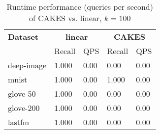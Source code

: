 \begin{table*}[!t]
    \caption{Runtime performance (queries per second) of CAKES vs. linear, $k=100$}
    \label{table:results:ann-alt-100}
    \vskip 0.15in
    \begin{center}
    \begin{small}
    \begin{sc}
    \begin{tabular}{|l|l|l|l|l|}
    \textbf{Dataset}  & \multicolumn{2}{|c|}{\textbf{linear}} & \multicolumn{2}{|c|}{\textbf{CAKES}}  \\
    &                    Recall & QPS                           & Recall & QPS                           \\
    \hline
    deep-image             & 1.000 & 0.00                           & 0.00 & 0.00      \\
    \hline
    mnist                   & 1.000 & 0.00                          & 1.000 & 0.00      \\
    \hline
    glove-50               & 1.000 & 0.00                           & 0.00 & 0.00      \\
    \hline 
    glove-200              & 1.000 & 0.00                           & 0.00 & 0.00     \\
    \hline
    lastfm                 & 1.000 & 0.00                           & 0.00 & 0.00           \\
    \hline
    \end{tabular}
    \end{sc}
    \end{small}
    \end{center}
    \vskip -0.1in
    \end{table*}
    